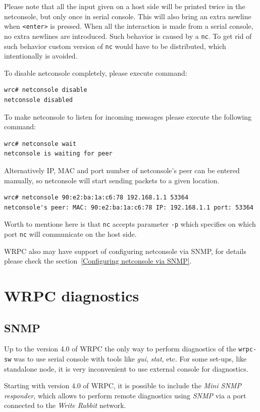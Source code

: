 \documentclass[a4paper, 12pt]{article}
\renewcommand{\_}{\underscore\allowbreak}
\begin{document}
Please note that all the input given on a host side will be printed twice in
the netconsole, but only once in serial console. This will also bring an extra
newline when \texttt{<enter>} is pressed. When all the interaction is made from
a serial console, no extra newlines are introduced.
Such behavior is caused by a \texttt{nc}. To get rid of such behavior custom
version of \texttt{nc} would have to be distributed, which intentionally is
avoided.

To disable netconsole completely, please execute command:
\begin{lstlisting}
wrc# netconsole disable
netconsole disabled
\end{lstlisting}
To make netconsole to listen for incoming messages please execute the following
command:
\begin{lstlisting}
wrc# netconsole wait
netconsole is waiting for peer
\end{lstlisting}
Alternatively IP, MAC and port number of netconsole's peer can be entered
manually, so netconsole will start sending packets to a given location.
\begin{lstlisting}
wrc# netconsole 90:e2:ba:1a:c6:78 192.168.1.1 53364
netconsole's peer: MAC: 90:e2:ba:1a:c6:78 IP: 192.168.1.1 port: 53364
\end{lstlisting}
Worth to mentione here is that \texttt{nc} accepts parameter \texttt{-p}
which specifies on which port \texttt{nc} will communicate on the host side.

WRPC also may have support of configuring netconsole via SNMP, for details
please check the section~\ref{Configuring netconsole via SNMP}.

\newpage
\section{WRPC diagnostics}
\subsection{SNMP}
\label{Diagnostics via SNMP}

Up to the version 4.0 of WRPC the only way to perform diagnostics
of the \texttt{wrpc-sw} was to use serial console with tools like \textit{gui}, \textit{stat},
etc. For some set-ups, like standalone node, it is very inconvenient to use
external console for diagnostics.

Starting with version 4.0 of WRPC, it is possible to include the \textit{Mini
SNMP responder}, which allows to perform remote diagnostics using \textit{SNMP} via
a port connected to the \textit{Write Rabbit} network.
\end{document}
